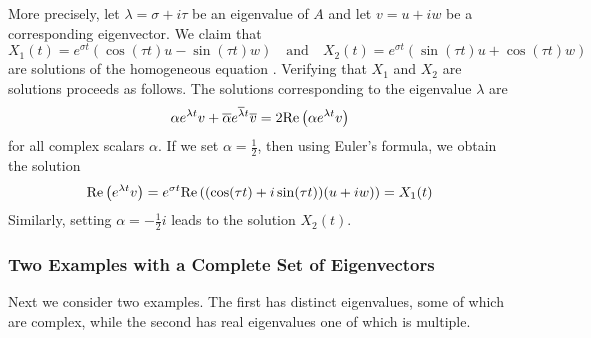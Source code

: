 \documentclass{ximera}
\begin{document}
More precisely, let $\lambda = \sigma+i\tau$ be an eigenvalue of $A$ and 
let $v=u+iw$ be a corresponding eigenvector.  We claim that 
\begin{equation}  \label{eq:reimsol}
X_1(t) = e^{\sigma t}(\cos(\tau t)u - \sin(\tau t)w)\quad
\mbox{and}\quad
X_2(t) = e^{\sigma t}(\sin(\tau t)u + \cos(\tau t)w)
\end{equation}
are solutions of the homogeneous equation .  Verifying that
$X_1$ and $X_2$ are solutions proceeds as follows.  The solutions 
corresponding to the eigenvalue $\lambda$ are 
\[
\alpha e^{\lambda t}v + \overline{\alpha} e^{\overline{\lambda}t}\overline{v}
= 2{\rm Re}\left(\alpha e^{\lambda t}v\right)
\]
for all complex scalars $\alpha$.  If we set $\alpha=\frac{1}{2}$, then 
using Euler's formula, we obtain the solution 
\[
{\rm Re}\left(e^{\lambda t}v\right) = e^{\sigma t}{\rm Re}\left((\cos(\tau t)+i\sin(\tau t))(u + iw)\right)=X_1(t)
\]
Similarly, setting $\alpha=-\frac{1}{2}i$ leads to the solution $X_2(t)$.  


\subsubsection*{Two Examples with a Complete Set of Eigenvectors}

Next we consider two examples.  The first has distinct eigenvalues, some 
of which are complex, while the second has real eigenvalues one of which is 
multiple.
\end{document}

